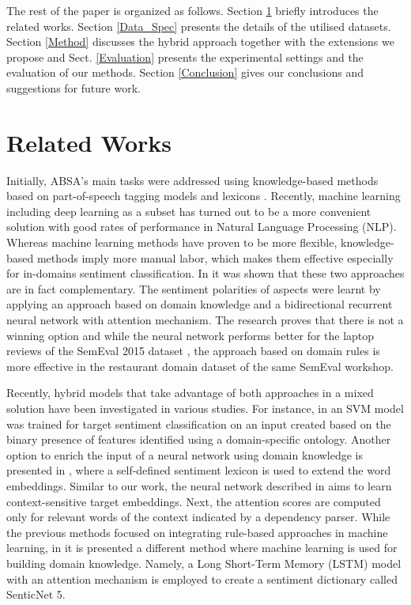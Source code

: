 \documentclass[hidelinks]{llncs}
\begin{document}
The rest of the paper is organized as follows. Section \ref{Related_Works} briefly introduces the related works. Section \ref{Data_Spec} presents the details of the utilised datasets. Section \ref{Method} discusses the hybrid approach together with the extensions we propose and Sect. \ref{Evaluation} presents the experimental settings and the evaluation of our methods. Section \ref{Conclusion} gives our conclusions and suggestions for future work.


\vspace{-0.5mm}
\section{Related Works}\label{Related_Works}
Initially, ABSA’s main tasks were addressed using knowledge-based methods based on part-of-speech tagging models and lexicons \cite{kiritchenko2014nrc, wagner2014dcu}. 
Recently, machine learning including deep learning as a subset has turned out to be a more convenient solution with good rates of performance in Natural Language Processing (NLP). Whereas machine learning methods have proven to be more flexible, knowledge-based methods imply more manual labor, which makes them effective especially for in-domains sentiment classification. In \cite{yanase2016bunji} it was shown that these two approaches are in fact complementary. The sentiment polarities of aspects were learnt by applying an approach based on domain knowledge and a bidirectional recurrent neural network with attention mechanism. The research proves that there is not a winning option and while the neural network performs better for the laptop reviews of the SemEval 2015 dataset \cite{pontiki2015semeval}, the approach based on domain rules is more effective in the restaurant domain dataset of the same SemEval workshop. 

Recently, hybrid models that take advantage of both approaches in a mixed solution have been investigated in various studies. For instance, in \cite{schouten2017ontology} an SVM model was trained for target sentiment classification on an input created based on the binary presence of features identified using a domain-specific ontology. Another option to enrich the input of a neural network using domain knowledge is presented in \cite{do2018aspect}, where a self-defined sentiment lexicon is used to extend the word embeddings. Similar to our work, the neural network described in \cite{he2018effective} aims to learn context-sensitive target embeddings. Next, the attention scores are computed only for relevant words of the context indicated by a dependency parser. While the previous methods focused on integrating rule-based approaches in machine learning, in \cite{cambria2018senticnet} it is presented a different method where machine learning is used for building domain knowledge. Namely, a Long Short-Term Memory (LSTM) model with an attention mechanism is employed to create a sentiment dictionary called SenticNet 5.
\end{document}
